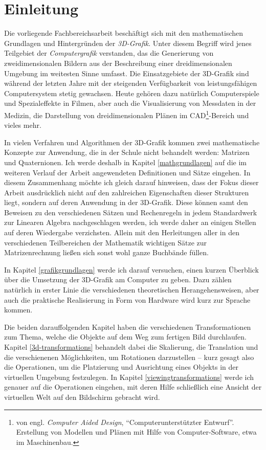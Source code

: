 \chapter{Einleitung}

Die vorliegende Fachbereichsarbeit beschäftigt sich mit den mathematischen Grundlagen und Hintergründen der \emph{3D-Grafik}. Unter diesem Begriff wird jenes Teilgebiet der \emph{Computergrafik} verstanden, das die Generierung von zweidimensionalen Bildern aus der Beschreibung einer dreidimensionalen Umgebung im weitesten Sinne umfasst. Die Einsatzgebiete der 3D-Grafik sind während der letzten Jahre mit der steigenden Verfügbarkeit von leistungsfähigen Computersystem stetig gewachsen. Heute gehören dazu natürlich Computerspiele und Spezialeffekte in Filmen, aber auch die Visualisierung von Messdaten in der Medizin, die Darstellung von dreidimensionalen Plänen im CAD\footnote{von engl. \emph{Computer Aided Design}, \enquote{Computerunterstützter Entwurf}. Erstellung von Modellen und Plänen mit Hilfe von Computer-Software, etwa im Maschinenbau.}-Bereich und vieles mehr.

In vielen Verfahren und Algorithmen der 3D-Grafik kommen zwei mathematische Konzepte zur Anwendung, die in der Schule nicht behandelt werden: Matrizen und Quaternionen. Ich werde deshalb in Kapitel \ref{mathgrundlagen} auf die im weiteren Verlauf der Arbeit angewendeten Definitionen und Sätze eingehen. In diesem Zusammenhang möchte ich gleich darauf hinweisen, dass der Fokus dieser Arbeit ausdrücklich nicht auf den zahlreichen Eigenschaften dieser Strukturen liegt, sondern auf deren Anwendung in der 3D-Grafik. Diese können samt den Beweisen zu den verschiedenen Sätzen und Rechenregeln in jedem Standardwerk zur Linearen Algebra nachgeschlagen werden, ich werde daher an einigen Stellen auf deren Wiedergabe verzichsten. Allein mit den Herleitungen aller in den verschiedenen Teilbereichen der Mathematik wichtigen Sätze zur Matrizenrechnung ließen sich sonst wohl ganze Buchbände füllen.


In Kapitel \ref{grafikgrundlagen} werde ich darauf versuchen, einen kurzen Überblick über die Umsetzung der 3D-Grafik am Computer zu geben. Dazu zählen natürlich in erster Linie die verschiedenen theoretischen Herangehensweisen, aber auch die praktische Realisierung in Form von Hardware wird kurz zur Sprache kommen.

Die beiden darauffolgenden Kapitel haben die verschiedenen Transformationen zum Thema, welche die Objekte auf dem Weg zum fertigen Bild durchlaufen. Kapitel \ref{3d-transformations} behandelt dabei die Skalierung, die Translation und die verschienenen Möglichkeiten, um Rotationen darzustellen -- kurz gesagt also die Operationen, um die Platzierung und Ausrichtung eines Objekts in der virtuellen Umgebung festzulegen. In Kapitel \ref{viewingtransformations} werde ich genauer auf die Operationen eingehen, mit deren Hilfe schließlich eine Ansicht der virtuellen Welt auf den Bildschirm gebracht wird.

